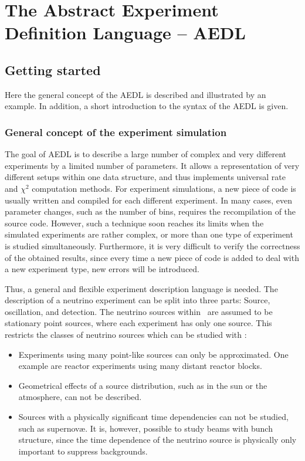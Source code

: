 
\part{The Abstract Experiment Definition Language -- AEDL}
\label{part:2}

\chapter{Getting started}

Here the general concept of the AEDL is described and illustrated by an example. In addition, a short introduction to the syntax of the AEDL is given.

\section{General concept of the experiment simulation}

The goal of AEDL is to describe a large number of complex and very 
different experiments by a limited number of parameters. It allows a
representation of very different setups within one data structure, and thus implements universal rate and $\chi^2$ computation methods. For experiment simulations, a new piece of code is usually written and compiled
for each different experiment. In many cases, even parameter changes, such as
the number of bins, requires the recompilation of the source code. 
However, such a technique soon reaches its limits when the simulated experiments are rather complex, or more than one type of experiment is studied simultaneously. Furthermore, it is very difficult to verify the correctness of the obtained results, since every time a new piece of code is added to 
deal with a new experiment type, new errors will be introduced.

Thus, a general and flexible experiment description language is needed.  
The description of a neutrino experiment can be split into three parts: Source, oscillation, and detection. The neutrino sources within \GLOBES\ 
are assumed to be stationary point sources, where each experiment has only 
one source. This restricts the classes of neutrino sources which can be studied with \GLOBES :
\begin{itemize}
\item
 Experiments using many point-like sources can only be approximated. One example are reactor experiments using many distant reactor blocks.
\item
 Geometrical effects of a source distribution, such as in the sun or the atmosphere, can not be described.
\item
 Sources with a physically significant time dependencies  can not be studied, such as  supernov\ae. It is, however, possible
to study beams with bunch structure, since the time dependence of the
neutrino source is physically only important to suppress backgrounds. 
\end{itemize}


